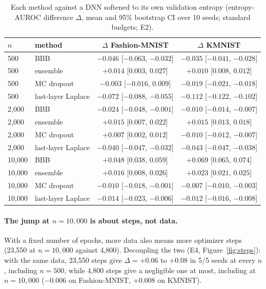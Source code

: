 \documentclass[10pt]{article}
\begin{document}
\begin{table}[!htb]
\centering\small
\caption{Each method against a DNN softened to its own validation entropy
(entropy-AUROC difference $\Delta$, mean and 95\% bootstrap CI over 10 seeds;
standard budgets; E2).}
\label{tab:grid}
\begin{tabular}{llcc}
\toprule
$n$ & method & $\Delta$ Fashion-MNIST & $\Delta$ KMNIST \\
\midrule
500 & BBB & $-0.046$ [$-0.063$, $-0.032$] & $-0.035$ [$-0.041$, $-0.028$] \\
500 & ensemble & $+0.014$ [$0.003$, $0.027$] & $+0.010$ [$0.008$, $0.012$] \\
500 & MC dropout & $-0.003$ [$-0.016$, $0.009$] & $-0.019$ [$-0.021$, $-0.018$] \\
500 & last-layer Laplace & $-0.072$ [$-0.088$, $-0.055$] & $-0.112$ [$-0.122$, $-0.102$] \\
\midrule
2{,}000 & BBB & $-0.024$ [$-0.048$, $-0.001$] & $-0.010$ [$-0.014$, $-0.007$] \\
2{,}000 & ensemble & $+0.015$ [$0.007$, $0.022$] & $+0.015$ [$0.013$, $0.018$] \\
2{,}000 & MC dropout & $+0.007$ [$0.002$, $0.012$] & $-0.010$ [$-0.012$, $-0.007$] \\
2{,}000 & last-layer Laplace & $-0.040$ [$-0.047$, $-0.032$] & $-0.043$ [$-0.047$, $-0.038$] \\
\midrule
10{,}000 & BBB & $\mathbf{+0.048}$ [$0.038$, $0.059$] & $\mathbf{+0.069}$ [$0.065$, $0.074$] \\
10{,}000 & ensemble & $+0.016$ [$0.008$, $0.026$] & $+0.023$ [$0.021$, $0.025$] \\
10{,}000 & MC dropout & $-0.010$ [$-0.018$, $-0.001$] & $-0.007$ [$-0.010$, $-0.003$] \\
10{,}000 & last-layer Laplace & $-0.014$ [$-0.023$, $-0.006$] & $-0.012$ [$-0.016$, $-0.008$] \\
\bottomrule
\end{tabular}
\end{table}

\paragraph{The jump at $n=10{,}000$ is about steps, not data.} With a fixed
number of epochs, more data also means more optimizer steps (23{,}550 at
$n=10{,}000$ against 4{,}800). Decoupling the two (E4,
Figure~\ref{fig:steps}): with the same data, 23{,}550 steps give
$\Delta=+0.06$ to $+0.08$ in 5/5 seeds at every $n$, including $n=500$, while
4{,}800 steps give a negligible one at most, including at $n=10{,}000$ ($-0.006$
on Fashion-MNIST, $+0.008$ on KMNIST).
\end{document}
